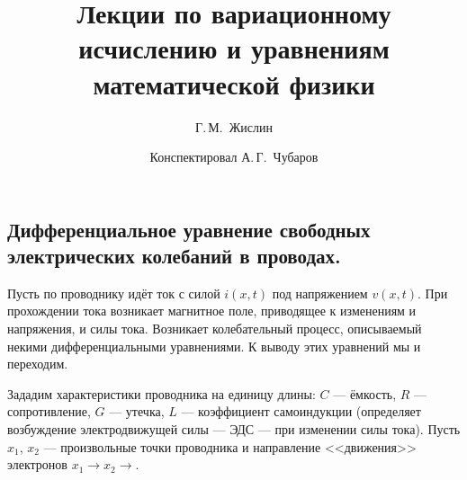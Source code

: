 \documentclass[12pt,a4paper,openany,fleqn]{book}
\newcommand{\mc}[1]{\ensuremath{\mathcal{#1}}}
\theoremstyle{definition}
\begin{document}
	\author{Г.\,М.~Жислин}
	\title{Лекции по вариационному исчислению и уравнениям математической физики}
	\date{Конспектировал А.\,Г.~Чубаров}
	
	
	
	\maketitle
	
	
	\renewcommand{\thepart}{\Asbuk{part}}
	\renewcommand{\thechapter}{\arabic{chapter}}
	\renewcommand{\thesection}{\arabic{section}}
	\renewcommand{\thesubsection}{\Roman{subsection}}
	\renewcommand{\thefootnote}{\roman{footnote}}
	\renewcommand{\phi}{\varphi}
	\renewcommand{\Re}{\ensuremath{\mc{R}e\,}}
	\renewcommand{\Im}{\ensuremath{\mc{I}m\,}}
	
	\setcounter{chapter}{13}
	\chapter{}
	\label{lecture14}
	\section[Телеграфные уравнения.]{Дифференциальное уравнение свободных электрических колебаний в проводах.}
	\label{lecture14section1}
	Пусть по проводнику идёт ток с силой $i(x,t)$ под напряжением $v(x,t)$. При прохождении тока возникает магнитное поле, приводящее к изменениям и напряжения, и силы тока. Возникает колебательный процесс, описываемый некими дифференциальными уравнениями. К выводу этих уравнений мы и переходим. 
	
	Зададим характеристики проводника на единицу длины: $C$ --- ёмкость, $R$ --- сопротивление, $G$ --- утечка, $L$ --- коэффициент самоиндукции (определяет возбуждение электродвижущей силы --- ЭДС --- при изменении силы тока). Пусть $x_1$, $x_2$ --- произвольные точки проводника и направление <<движения>> электронов $x_1\to x_2\to$. 
	\vspace{0.2cm}
	
	
	
\end{document}
